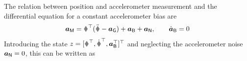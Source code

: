 The relation between position and accelerometer measurement and the differential equation for a constant accelerometer bias are
\begin{align}
 \aIMU = \R^\top(\rdd - \gravityAcc) + \aIMUB + \aIMUN,
\qquad
 \aIMUBd = 0
\end{align}
Introducing the state $z = [\r^\top, \rd^\top, \aIMUB^\top]^\top$ and neglecting the accelerometer noise $\boldsymbol{a}_{\mathsf{N}}=0$, this can be written as
